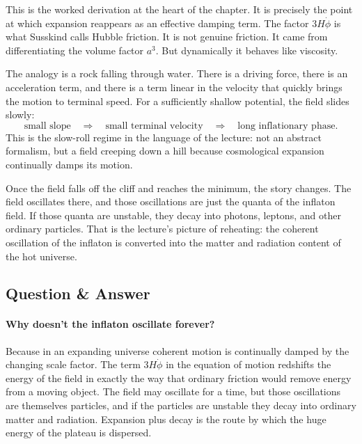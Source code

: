 This is the worked derivation at the heart of the chapter. It is precisely the point at which expansion reappears as an effective damping term. The factor \(3H\dot\phi\) is what Susskind calls Hubble friction. It is not genuine friction. It came from differentiating the volume factor \(a^3\). But dynamically it behaves like viscosity.

The analogy is a rock falling through water. There is a driving force, there is an acceleration term, and there is a term linear in the velocity that quickly brings the motion to terminal speed. For a sufficiently shallow potential, the field slides slowly:
\begin{equation}
\text{small slope} \quad \Longrightarrow \quad \text{small terminal velocity} \quad \Longrightarrow \quad \text{long inflationary phase}.
\end{equation}
This is the slow-roll regime in the language of the lecture: not an abstract formalism, but a field creeping down a hill because cosmological expansion continually damps its motion.

Once the field falls off the cliff and reaches the minimum, the story changes. The field oscillates there, and those oscillations are just the quanta of the inflaton field. If those quanta are unstable, they decay into photons, leptons, and other ordinary particles. That is the lecture's picture of reheating: the coherent oscillation of the inflaton is converted into the matter and radiation content of the hot universe.

\subsection{Question \& Answer}

\paragraph{Why doesn't the inflaton oscillate forever?}

Because in an expanding universe coherent motion is continually damped by the changing scale factor. The term \(3H\dot\phi\) in the equation of motion redshifts the energy of the field in exactly the way that ordinary friction would remove energy from a moving object. The field may oscillate for a time, but those oscillations are themselves particles, and if the particles are unstable they decay into ordinary matter and radiation. Expansion plus decay is the route by which the huge energy of the plateau is dispersed.

